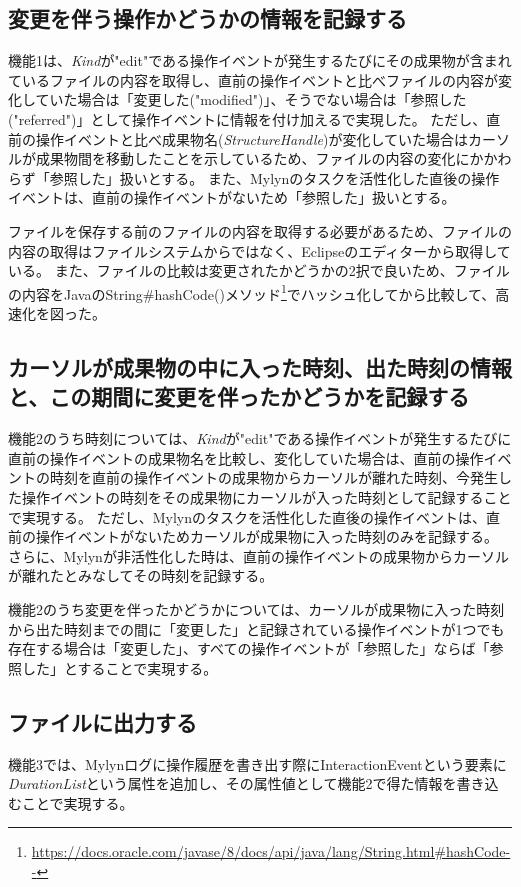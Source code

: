 \documentclass[a4paper]{jsbook}
\begin{document}
\subsection{変更を伴う操作かどうかの情報を記録する}
機能1は、{\it Kind}が"edit"である操作イベントが発生するたびにその成果物が含まれているファイルの内容を取得し、直前の操作イベントと比べファイルの内容が変化していた場合は「変更した("modified")」、そうでない場合は「参照した("referred")」として操作イベントに情報を付け加えるで実現した。
ただし、直前の操作イベントと比べ成果物名({\it StructureHandle})が変化していた場合はカーソルが成果物間を移動したことを示しているため、ファイルの内容の変化にかかわらず「参照した」扱いとする。
また、Mylynのタスクを活性化した直後の操作イベントは、直前の操作イベントがないため「参照した」扱いとする。

ファイルを保存する前のファイルの内容を取得する必要があるため、ファイルの内容の取得はファイルシステムからではなく、Eclipseのエディターから取得している。
また、ファイルの比較は変更されたかどうかの2択で良いため、ファイルの内容をJavaのString\#hashCode()メソッド\footnote{\url{https://docs.oracle.com/javase/8/docs/api/java/lang/String.html\#hashCode--}}でハッシュ化してから比較して、高速化を図った。

\subsection{カーソルが成果物の中に入った時刻、出た時刻の情報と、この期間に変更を伴ったかどうかを記録する}
機能2のうち時刻については、{\it Kind}が"edit"である操作イベントが発生するたびに直前の操作イベントの成果物名を比較し、変化していた場合は、直前の操作イベントの時刻を直前の操作イベントの成果物からカーソルが離れた時刻、今発生した操作イベントの時刻をその成果物にカーソルが入った時刻として記録することで実現する。
ただし、Mylynのタスクを活性化した直後の操作イベントは、直前の操作イベントがないためカーソルが成果物に入った時刻のみを記録する。
さらに、Mylynが非活性化した時は、直前の操作イベントの成果物からカーソルが離れたとみなしてその時刻を記録する。

機能2のうち変更を伴ったかどうかについては、カーソルが成果物に入った時刻から出た時刻までの間に「変更した」と記録されている操作イベントが1つでも存在する場合は「変更した」、すべての操作イベントが「参照した」ならば「参照した」とすることで実現する。

\subsection{ファイルに出力する}
機能3では、Mylynログに操作履歴を書き出す際にInteractionEventという要素に{\it DurationList}という属性を追加し、その属性値として機能2で得た情報を書き込むことで実現する。
\end{document}
